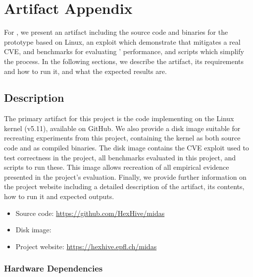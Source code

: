 \section{Artifact Appendix}

For \midas{}, we present an artifact including the source code and 
binaries for the prototype based on Linux, an exploit which demonstrate 
that \midas{} mitigates a real CVE, and benchmarks for evaluating 
\midas{}' performance, and scripts which simplify the process.
In the following sections, we describe the artifact, its requirements 
and how to run it, and what the expected results are.


\subsection{Description}


The primary artifact for this project is the code implementing \midas{} on the
Linux kernel (v5.11), available on GitHub.
We also provide a disk image suitable for recreating experiments from this
project, containing the kernel as both source code and as compiled binaries.
The disk image contains the CVE exploit used to test correctness in the 
project, all benchmarks evaluated in this project, and scripts to run these.
This image allows recreation of all empirical evidence presented in the 
project's evaluation.
Finally, we provide further information on the project website including
a detailed description of the artifact, its contents, how to run it 
and expected outputs.
\begin{itemize}
  \item Source code: \url{https://github.com/HexHive/midas}
  \item Disk image: \zenodorecord
  \item Project website: \url{https://hexhive.epfl.ch/midas}
\end{itemize}

\subsubsection{Hardware Dependencies}

